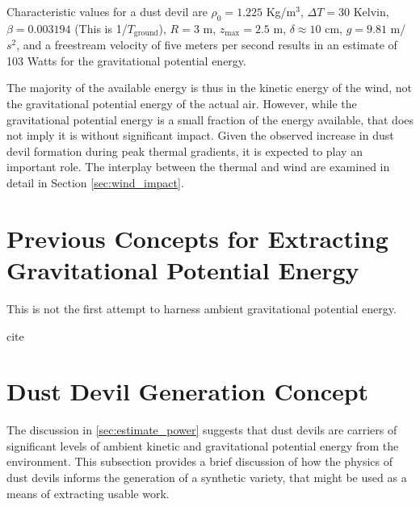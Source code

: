 Characteristic values for a dust devil are $\rho_0 = 1.225$ Kg/$\text{m}^3$, 
$\Delta T= 30$ Kelvin, $\beta = 0.003194$ (This is 1/$T_{\text{ground}}$), 
$R = 3 $ m, $z_\text{max} = 2.5$ m, $\delta \approx 10$ cm, $g=9.81$ m/$s^2$, and a
freestream velocity of five meters per second results in an estimate of
103 Watts for the gravitational potential energy. 

The majority of the available energy is thus in the kinetic energy of
the wind, not the gravitational potential energy of the actual air. 
However, while the gravitational potential energy is a small fraction of
the energy available, that does not imply it is without significant
impact. 
Given the observed increase in dust devil formation during peak thermal
gradients, it is expected to play an important role. The interplay
between the thermal and wind are examined in detail in Section
\ref{sec:wind_impact}. 

\section{Previous Concepts for Extracting Gravitational Potential
 Energy}

This is not the first attempt to harness ambient gravitational potential
energy. 

cite

%
%
%
%
%
%
%
%
%

\section{Dust Devil Generation Concept}

The discussion in \ref{sec:estimate_power} suggests that dust devils are
carriers of significant levels of ambient kinetic and gravitational
potential energy from the environment. This subsection provides a brief
discussion of how the physics of dust devils informs the generation of a
synthetic variety, that might be used as a means of extracting usable work.  

